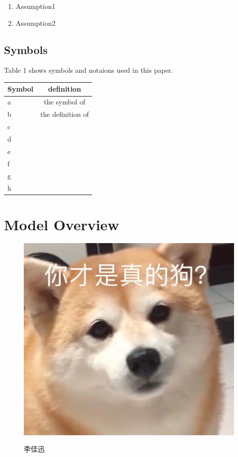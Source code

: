 \begin{enumerate}	%
	\item Assumption1
	\item Assumption2
\end{enumerate}

\subsection{Symbols}
Table 1 shows symbols and notaions used in this paper.

\begin{center}	%
	\begin{tabular}{lc}
		\hline
		Symbol & definition \\ \hline
		a&the symbol of            \\
		b&the definition of            \\
		c&            \\
		d&            \\
		e&            \\
		f&            \\
		g&            \\
		h&            \\ \hline
	\end{tabular}
\end{center}

\section{Model Overview}


\begin{figure}
	\centering
	\includegraphics[scale=0.5]{test1.eps}\\%
	\caption{李佳迅}	%
\end{figure}


